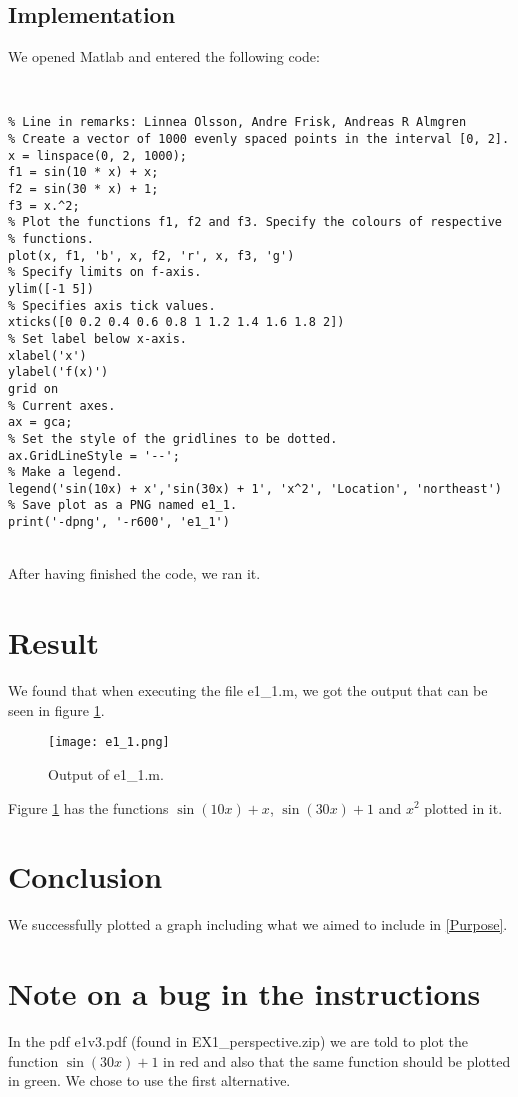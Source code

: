 \documentclass[a4paper,12pt]{article}
\begin{document}
\subsection{Implementation}

{\setlength{\parindent}{0cm}
We opened Matlab and entered the following code:
}

\\

\iffalse
Sorry for the ugly formatted code down below, it looks better in the m-file e1_1.m.
\fi

\begin{lstlisting}
% Line in remarks: Linnea Olsson, Andre Frisk, Andreas R Almgren
% Create a vector of 1000 evenly spaced points in the interval [0, 2]. 
x = linspace(0, 2, 1000); 
f1 = sin(10 * x) + x;
f2 = sin(30 * x) + 1;
f3 = x.^2; 
% Plot the functions f1, f2 and f3. Specify the colours of respective 
% functions.
plot(x, f1, 'b', x, f2, 'r', x, f3, 'g') 
% Specify limits on f-axis.
ylim([-1 5])
% Specifies axis tick values.
xticks([0 0.2 0.4 0.6 0.8 1 1.2 1.4 1.6 1.8 2]) 
% Set label below x-axis.
xlabel('x') 
ylabel('f(x)') 
grid on 
% Current axes.
ax = gca; 
% Set the style of the gridlines to be dotted.
ax.GridLineStyle = '--'; 
% Make a legend.
legend('sin(10x) + x','sin(30x) + 1', 'x^2', 'Location', 'northeast') 
% Save plot as a PNG named e1_1. 
print('-dpng', '-r600', 'e1_1') 
\end{lstlisting}

\\

{\setlength{\parindent}{0cm}
After having finished the code, we ran it.
}

\newpage

\section{Result}

We found that when executing the file e1\_1.m, we got the output that can be seen in figure \ref{Graph}.

\begin{figure}[h!]
\centering
\texttt{[image: e1\_1.png]}
\caption{Output of e1\_1.m. }
\label{Graph}
\end{figure}

{\setlength{\parindent}{0cm}
Figure \ref{Graph} has the functions $\sin(10x) + x$, $\sin(30x) + 1$ and $x^{2}$ plotted in it. 
}

\section{Conclusion}

We successfully plotted a graph including what we aimed to include in \ref{Purpose}.

\section{Note on a bug in the instructions}

In the pdf e1v3.pdf (found in EX1\_perspective.zip) we are told to plot the function $\sin(30x) + 1$ in red and also that the same function should be plotted in green. We chose to use the first alternative. 
\end{document}
